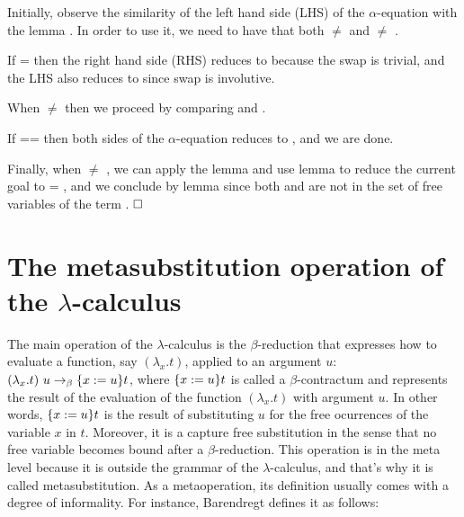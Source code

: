  Initially, observe the similarity of the left hand side (LHS) of the $\alpha$-equation with the lemma . In order to use it, we need to have that both  \ensuremath{\not=}  and  \ensuremath{\not=} . 
\begin{coqdoccode}
\end{coqdoccode}
If  =  then the right hand side (RHS) reduces to  because the swap is trivial, and the LHS also reduces to  since swap is involutive.
\begin{coqdoccode}
\end{coqdoccode}
When  \ensuremath{\not=}  then we proceed by comparing  and .
\begin{coqdoccode}
\end{coqdoccode}
If  ==  then both sides of the $\alpha$-equation reduces to    , and we are done. 
\begin{coqdoccode}
\end{coqdoccode}
Finally, when  \ensuremath{\not=} , we can apply the lemma  and use lemma  to reduce the current goal to     = , and we conclude by lemma  since both  and  are not in the set of free variables of the term . $\hfill\Box$
\begin{coqdoccode}
\coqdocemptyline
\end{coqdoccode}
\section{The metasubstitution operation of the $\lambda$-calculus}



 The main operation of the $\lambda$-calculus is the $\beta$-reduction that expresses how to evaluate a function, say $(\lambda_x.t)$, applied to an argument $u$: $(\lambda_x.t)\ u \to_{\beta} \metasub{t}{x}{u}$, where $\metasub{t}{x}{u}$ is called a $\beta$-contractum and represents the result of the evaluation of the function $(\lambda_x.t)$ with argument $u$. In other words, $\metasub{t}{x}{u}$ is the result of substituting $u$ for the free ocurrences of the variable $x$ in $t$. Moreover, it is a capture free substitution in the sense that no free variable becomes bound after a $\beta$-reduction. This operation is in the meta level because it is outside the grammar of the $\lambda$-calculus, and that's why it is called metasubstitution. As a metaoperation, its definition usually comes with a degree of informality. For instance, Barendregt \cite{barendregtLambdaCalculusIts1984} defines it as follows:


